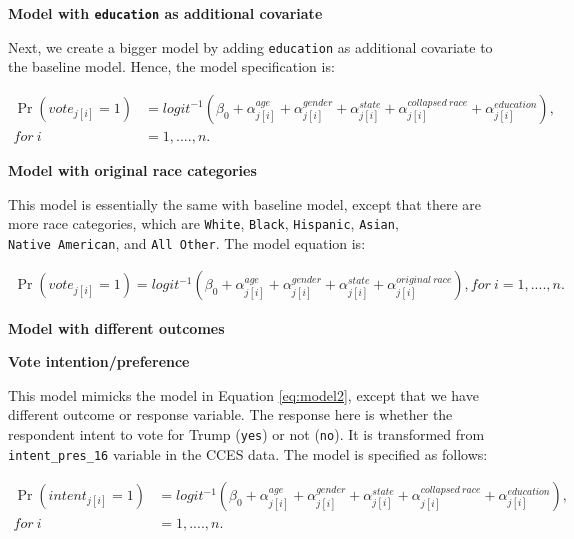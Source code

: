 \documentclass{monashthesis}
\begin{document}
\vspace{\baselineskip}

\textbf{Model with \texttt{education} as additional covariate}

Next, we create a bigger model by adding \texttt{education} as additional covariate to the baseline model. Hence, the model specification is:

\begin{equation} 
\begin{split}
\Pr(vote_{j[i]} = 1) &= logit^{-1}\left(\beta_0 + \alpha^{age}_{j[i]} + \alpha^{gender}_{j[i]} + \alpha^{state}_{j[i]} + \alpha^{collapsed\ race}_{j[i]} + \alpha^{education}_{j[i]}\right), \\
for\ i &= 1, ...., n.
\end{split}
\label{eq:model2}
\end{equation}

\vspace{\baselineskip}

\textbf{Model with original race categories}

This model is essentially the same with baseline model, except that there are more race categories, which are \texttt{White}, \texttt{Black}, \texttt{Hispanic}, \texttt{Asian}, \texttt{Native\ American}, and \texttt{All\ Other}. The model equation is:

\begin{equation} 
\begin{split}
\Pr(vote_{j[i]} = 1) = logit^{-1}\left(\beta_0 + \alpha^{age}_{j[i]} + \alpha^{gender}_{j[i]} + \alpha^{state}_{j[i]} + \alpha^{original\ race}_{j[i]}\right), for\ i = 1, ...., n.
\end{split}
\label{eq:model3}
\end{equation}

\textbf{Model with different outcomes}

\textbf{Vote intention/preference}

This model mimicks the model in Equation \eqref{eq:model2}, except that we have different outcome or response variable. The response here is whether the respondent intent to vote for Trump (\texttt{yes}) or not (\texttt{no}). It is transformed from \texttt{intent\_pres\_16} variable in the CCES data. The model is specified as follows:

\begin{equation} 
\begin{split}
\Pr(intent_{j[i]} = 1) &= logit^{-1}\left(\beta_0 + \alpha^{age}_{j[i]} + \alpha^{gender}_{j[i]} + \alpha^{state}_{j[i]} + \alpha^{collapsed\ race}_{j[i]} + \alpha^{education}_{j[i]}\right), \\
for\ i &= 1, ...., n.
\end{split}
\label{eq:model4a}
\end{equation}
\end{document}
